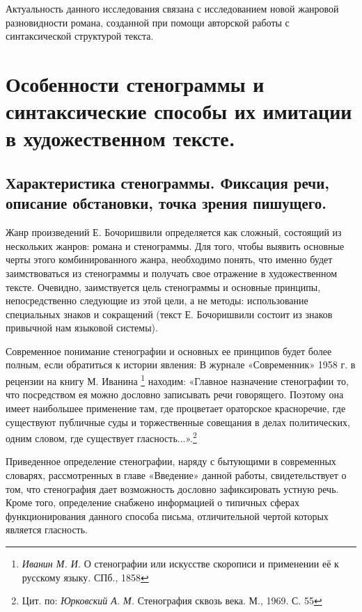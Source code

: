 \documentclass{kursa4}
\begin{document}
    Актуальность данного исследования связана с исследованием новой жанровой разновидности романа, созданной при помощи авторской работы с синтаксической структурой текста. 

  \setcounter{chapter}{0}
  \chapter {Особенности стенограммы и синтаксические способы их имитации в художественном тексте.}

    \section {Характеристика стенограммы. Фиксация речи, описание обстановки, точка зрения пишущего.}

      Жанр произведений Е. Бочоришвили определяется как сложный, состоящий из нескольких жанров: романа и стенограммы. Для того, чтобы выявить основные черты этого комбинированного жанра, необходимо понять, что именно будет заимствоваться из стенограммы и получать свое отражение в художественном тексте. Очевидно, заимствуется цель стенограммы и основные принципы, непосредственно следующие из этой цели, а не методы: использование специальных знаков и сокращений (текст Е. Бочоришвили состоит из знаков привычной нам языковой системы). 

      Современное понимание стенографии и основных ее принципов будет более полным, если обратиться к истории явления: В журнале «Современник» 1958 г. в рецензии на книгу М. Иванина \footnote{\textit{Иванин М. И. }О стенографии или искусстве скорописи и применении её к русскому языку. СПб., 1858} находим: «Главное назначение стенографии то, что посредством ея можно дословно записывать речи говорящего. Поэтому она имеет наибольшее применение там, где процветает ораторское красноречие, где существуют публичные суды и торжественные совещания в делах политических, одним словом, где существует гласность...».\footnote{{ Цит. по: }\textit{{Юрковский А. М.
      }}{Стенография сквозь века. М., 1969. С. 55}}{ }

       Приведенное определение стенографии, наряду с бытующими в современных словарях, рассмотренных в главе «Введение» данной работы, свидетельствует о том, что стенография дает возможность дословно зафиксировать устную речь. Кроме того, определение снабжено информацией о типичных сферах функционирования данного способа письма, отличительной чертой которых является гласность. 
\end{document}
